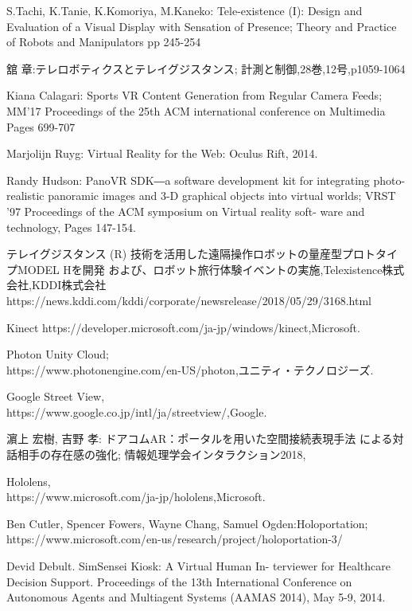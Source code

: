 \begin{thebibliography}{99}
S.Tachi, K.Tanie, K.Komoriya, M.Kaneko: Tele-existence (I): Design and Evaluation of a Visual Display with Sensation of Presence; 
Theory and Practice of Robots and Manipulators pp 245-254

舘 章:テレロボティクスとテレイグジスタンス; 計測と制御,28巻,12号,p1059-1064

Kiana Calagari: Sports VR Content Generation from Regular Camera Feeds; MM'17 Proceedings of the 25th ACM international conference on Multimedia
Pages 699-707

Marjolijn Ruyg: Virtual Reality for the Web: Oculus Rift, 2014.

Randy Hudson: PanoVR SDK―a software development kit for integrating photo-realistic panoramic images and 3-D graphical objects into virtual worlds; VRST ’97 Proceedings of the ACM symposium on Virtual reality soft- ware and technology, Pages 147-154.

テレイグジスタンス (R) 技術を活用した遠隔操作ロボットの量産型プロトタイプMODEL Hを開発 および、ロボット旅行体験イベントの実施,Telexistence株式会社,KDDI株式会社\\
https://news.kddi.com/kddi/corporate/newsrelease/2018/05/29/3168.html

Kinect
https://developer.microsoft.com/ja-jp/windows/kinect,Microsoft.

Photon Unity Cloud;\\ https://www.photonengine.com/en-US/photon,ユニティ・テクノロジーズ.

Google Street View,\\
https://www.google.co.jp/intl/ja/streetview/,Google.

濵上 宏樹, 吉野 孝: ドアコムAR：ポータルを用いた空間接続表現手法
による対話相手の存在感の強化; 情報処理学会インタラクション2018, 

Hololens,\\
https://www.microsoft.com/ja-jp/hololens,Microsoft.

Ben Cutler, Spencer Fowers, Wayne Chang, Samuel Ogden:Holoportation;\\ https://www.microsoft.com/en-us/research/project/holoportation-3/

Devid Debult. SimSensei Kiosk: A Virtual Human In- terviewer for Healthcare Decision Support. Proceedings of the 13th International Conference on Autonomous Agents and Multiagent Systems (AAMAS 2014), May 5-9, 2014.


\end{thebibliography}
